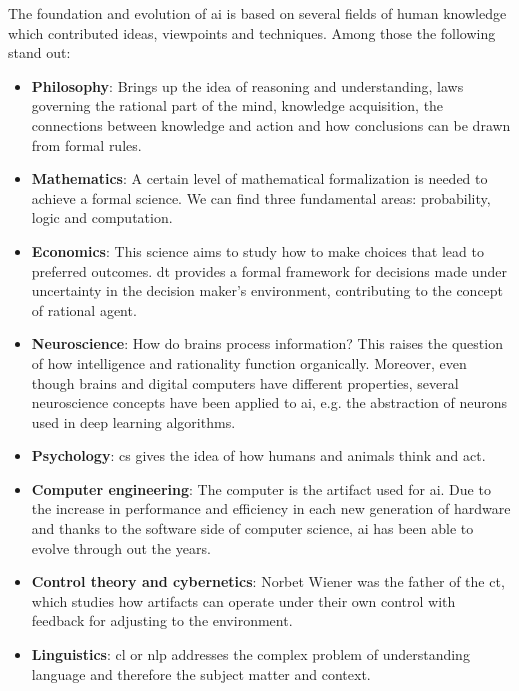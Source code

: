 The foundation and evolution of \gls{ai} is based on several fields of human knowledge which contributed ideas, viewpoints and techniques. Among those the following stand out:~\cite{aiState}

\begin{itemize}
    \item \textbf{Philosophy}: Brings up the idea of reasoning and understanding, laws governing the rational part of the mind, knowledge acquisition, the connections between knowledge and action and how conclusions can be drawn from formal rules.
    \item \textbf{Mathematics}: A certain level of mathematical formalization is needed to achieve a formal science. We can find three fundamental areas: probability, logic and computation.
    \item \textbf{Economics}: This science aims to study how to make choices that lead to preferred outcomes. \gls{dt} provides a formal framework for decisions made under uncertainty in the decision maker's environment, contributing to the concept of rational agent. 
    \item \textbf{Neuroscience}: How do brains process information? This raises the question of how intelligence and rationality function organically. Moreover, even though brains and digital computers have different properties, several neuroscience concepts have been applied to \gls{ai}, e.g. the abstraction of neurons used in deep learning algorithms. 
    \item \textbf{Psychology}: \gls{cs} gives the idea of how humans and animals think and act.
    \item \textbf{Computer engineering}: The computer is the artifact used for \gls{ai}. Due to the increase in performance and efficiency in each new generation of hardware and thanks to the software side of computer science, \gls{ai} has been able to evolve through out the years.
    \item \textbf{Control theory and cybernetics}: Norbet Wiener was the father of the \gls{ct}, which studies how artifacts can operate under their own control with feedback for adjusting to the environment.
    \item \textbf{Linguistics}: \gls{cl} or \gls{nlp} addresses the complex problem of understanding language and therefore the subject matter and context.
\end{itemize}


